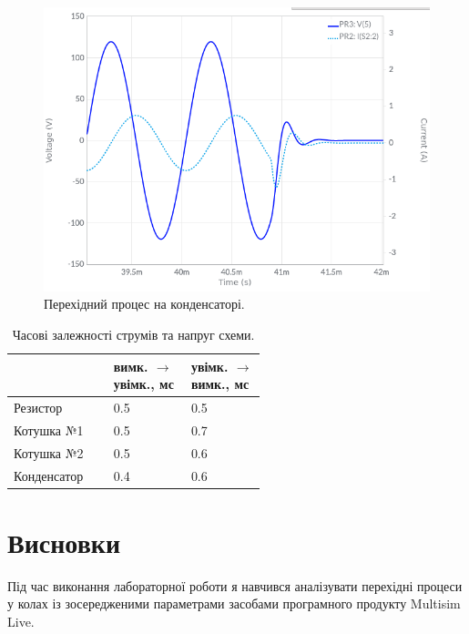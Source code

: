 \documentclass{article}
\begin{document}
\begin{normalsize}
	\begin{figure}[H]
		\centering
		\includegraphics[scale=0.5]{42}
		\caption{Перехідний процес на конденсаторі.}
	\end{figure}

	\begin{table}[H]
		\centering
		\renewcommand*\arraystretch{1.3}
		\begin{tabular}{|p{0.15\linewidth}|p{0.2\linewidth}|p{0.2\linewidth}|}
			\hline
			& вимк. $\rightarrow$ увімк., мс & увімк. $\rightarrow$ вимк., мс \\
			\hline
			Резистор & 0.5 & 0.5 \\
			\hline
			Котушка №1 & 0.5 & 0.7 \\
			\hline
			Котушка №2 & 0.5 & 0.6 \\
			\hline
			Конденсатор & 0.4 & 0.6 \\
			\hline
		\end{tabular}
		\caption{Часові залежності струмів та напруг схеми.}
	\end{table}

	\section*{Висновки}
	Під час виконання лабораторної роботи я навчився аналізувати перехідні процеси у колах із зосередженими параметрами засобами програмного продукту Multisim Live.
	    
\end{normalsize}
\end{document}
